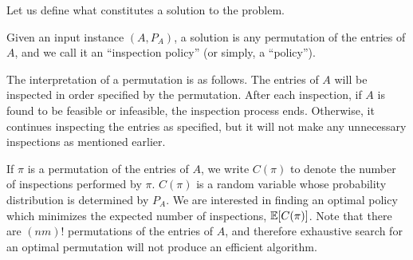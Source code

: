  Let us define what constitutes a solution to the problem. 
 \begin{definition}
 	Given an input instance $(A,P_{A})$, a solution is any permutation of the entries of $A$, and we call it an ``inspection policy'' (or simply, a ``policy'').
 \end{definition}
 The interpretation of a permutation is as follows. The entries of $A$ will be inspected in order specified by the permutation. After each inspection, if $A$ is found to be feasible or infeasible, the inspection process ends. Otherwise, it continues inspecting the entries as specified, but it will not make any unnecessary inspections as mentioned earlier. 

 If $\pi$ is a permutation of the entries of $A$, we write $C(\pi)$ to denote the number of inspections performed by $\pi$. $C(\pi)$ is a random variable whose probability distribution is determined by $P_A$. We are interested in finding an optimal policy which minimizes the expected number of inspections, $\mathbb{E}[C(\pi)]$.
 Note that there are $(nm)!$ permutations of the entries of $A$, and therefore exhaustive search for an optimal permutation will not produce an efficient algorithm. 

